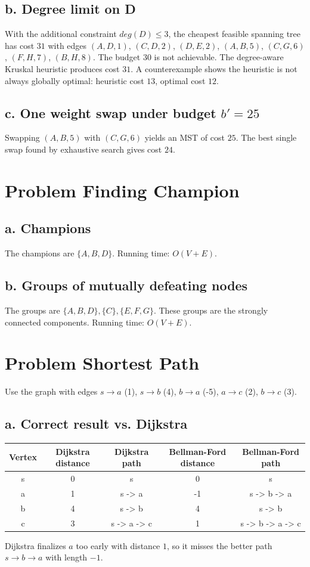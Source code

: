 \documentclass[11pt]{article}
\begin{document}
\subsection*{b. Degree limit on D}
With the additional constraint \(deg(D) \le 3\), the cheapest feasible spanning tree has cost \( 31 \) with edges \((A, D, 1)\), \((C, D, 2)\), \((D, E, 2)\), \((A, B, 5)\), \((C, G, 6)\), \((F, H, 7)\), \((B, H, 8)\).
The budget \(30\) is not achievable.
The degree-aware Kruskal heuristic produces cost \( 31 \).
A counterexample shows the heuristic is not always globally optimal: heuristic cost \( 13 \), optimal cost \( 12 \).
\subsection*{c. One weight swap under budget \(b' = 25\)}
Swapping \((A, B, 5)\) with \((C, G, 6)\) yields an MST of cost \( 25 \).
The best single swap found by exhaustive search gives cost \( 24 \).
\section{Problem Finding Champion}
\subsection*{a. Champions}
The champions are \( \{A, B, D\} \).
Running time: \(O(V + E)\).
\subsection*{b. Groups of mutually defeating nodes}
The groups are \( \{A, B, D\}, \{C\}, \{E, F, G\} \).
These groups are the strongly connected components.
Running time: \(O(V + E)\).
\section{Problem Shortest Path}
Use the graph with edges \(s \rightarrow a\) (1), \(s \rightarrow b\) (4), \(b \rightarrow a\) (-5), \(a \rightarrow c\) (2), \(b \rightarrow c\) (3).
\subsection*{a. Correct result vs. Dijkstra}
\begin{tabular}{|c|c|c|c|c|}
\hline
Vertex & Dijkstra distance & Dijkstra path & Bellman-Ford distance & Bellman-Ford path \\
\hline
s & 0 & s & 0 & s \\
a & 1 & s -> a & -1 & s -> b -> a \\
b & 4 & s -> b & 4 & s -> b \\
c & 3 & s -> a -> c & 1 & s -> b -> a -> c \\
\hline
\end{tabular}
Dijkstra finalizes \(a\) too early with distance \(1\), so it misses the better path \(s \rightarrow b \rightarrow a\) with length \(-1\).
\end{document}
